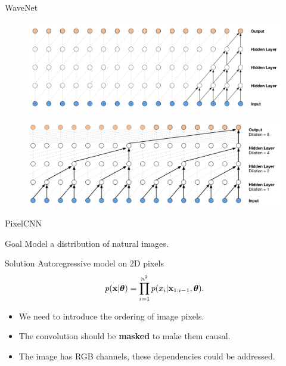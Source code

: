 \begin{frame}{WaveNet}
	\begin{figure}
	    \centering
	    \includegraphics[width=0.9\linewidth]{figs/wavenet1.png}
	\end{figure}
	
	\begin{figure}
	    \centering
	    \includegraphics[width=0.9\linewidth]{figs/wavenet2.png}
	\end{figure}
\end{frame}
\begin{frame}{PixelCNN}
	\begin{block}{Goal}
		Model a distribution of natural images.
	\end{block}
	\begin{block}{Solution}
		Autoregressive model on 2D pixels
		\[
		    p(\mathbf{x} | \boldsymbol{\theta}) = \prod_{i=1}^{n^2} p(x_i|\mathbf{x}_{1:i-1}, \boldsymbol{\theta}).
		\]
		\begin{itemize}
			\item We need to introduce the ordering of image pixels.
		    \item The convolution should be \textbf{masked} to make them causal.
		    \item The image has RGB channels, these dependencies could be addressed.
		\end{itemize}
	\end{block}
\end{frame}
